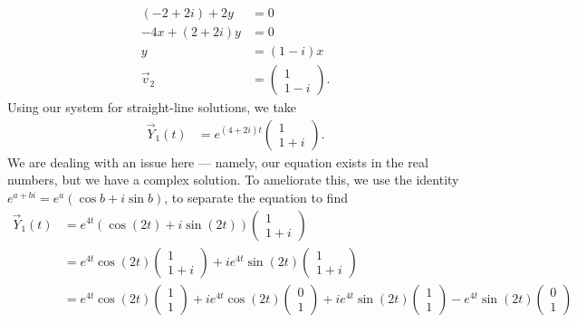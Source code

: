 \documentclass[10pt]{mypackage}
\begin{document}
\begin{example}
\begin{align*}
    \left(-2 + 2i\right) + 2y &= 0\\
    -4x + \left(2+2i\right)y &= 0\\
    y &= \left(1 - i\right)x\\
    \vec{v}_2 &= \begin{pmatrix}1\\1 - i\end{pmatrix}.
  \end{align*}
  Using our system for straight-line solutions, we take
  \begin{align*}
    \vec{Y}_1(t) &= e^{\left(4+2i\right)t} \begin{pmatrix}1\\1+i\end{pmatrix}.
  \end{align*}
  We are dealing with an issue here --- namely, our equation exists in the real numbers, but we have a complex solution. To ameliorate this, we use the identity $e^{a+bi} = e^{a}\left(\cos b + i\sin b\right)$, to separate the equation to find
  \begin{align*}
    \vec{Y}_1\left(t\right) &= e^{4t}\left(\cos\left(2t\right) + i\sin\left(2t\right)\right) \begin{pmatrix}1\\1+i\end{pmatrix}\\
                            &= e^{4t}\cos\left(2t\right) \begin{pmatrix} 1\\1+i\end{pmatrix} + ie^{4t}\sin\left(2t\right) \begin{pmatrix}1\\1+i\end{pmatrix}\\
                            &= e^{4t}\cos\left(2t\right) \begin{pmatrix}1\\1\end{pmatrix} + ie^{4t}\cos\left(2t\right) \begin{pmatrix}0\\1\end{pmatrix} + ie^{4t}\sin\left(2t\right) \begin{pmatrix}1\\1\end{pmatrix} - e^{4t}\sin\left(2t\right) \begin{pmatrix}0\\1\end{pmatrix}\\

\end{align*}
\end{example}
\end{document}
